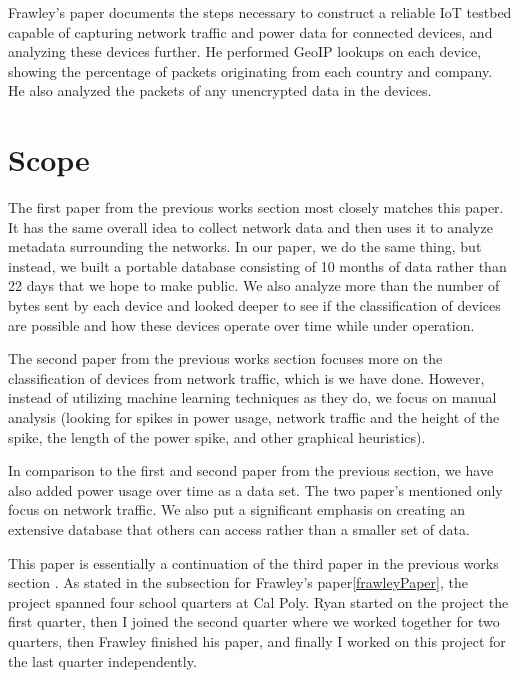 Frawley's paper documents the steps necessary to construct a reliable IoT testbed capable of capturing network traffic and power data for connected devices, and analyzing these devices further. He performed GeoIP\cite{maxmind} lookups on each device, showing the percentage of packets originating from each country and company. He also analyzed the packets of any unencrypted data in the devices.

\section{Scope}
\label{Scope}
The first paper from the previous works section\cite{home_iot} most closely matches this paper. It has the same overall idea to collect network data and then uses it to analyze metadata surrounding the networks. In our paper, we do the same thing, but instead, we built a portable database consisting of 10 months of data rather than 22 days that we hope to make public. We also analyze more than the number of bytes sent by each device and looked deeper to see if the classification of devices are possible and how these devices operate over time while under operation.

The second paper from the previous works section\cite{Meidan:2017:PML:3019612.3019878} focuses more on the classification of devices from network traffic, which is we have done. However, instead of utilizing machine learning techniques as they do, we focus on manual analysis (looking for spikes in power usage, network traffic and the height of the spike, the length of the power spike, and other graphical heuristics).

In comparison to the first \cite{home_iot} and second paper \cite{Meidan:2017:PML:3019612.3019878} from the previous section, we have also added power usage over time as a data set. The two paper's mentioned only focus on network traffic. We also put a significant emphasis on creating an extensive database that others can access rather than a smaller set of data.

This paper is essentially a continuation of the third paper in the previous works section \cite{frawley_2018}. As stated in the subsection for Frawley's paper\ref{frawleyPaper}, the project spanned four school quarters at Cal Poly. Ryan started on the project the first quarter, then I joined the second quarter where we worked together for two quarters, then Frawley finished his paper, and finally I worked on this project for the last quarter independently.

